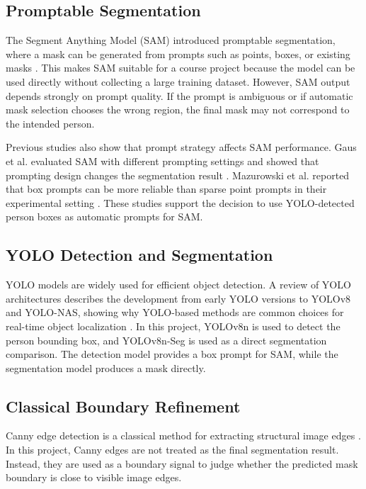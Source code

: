 \documentclass[conference]{IEEEtran}
\begin{document}
\subsection{Promptable Segmentation}
The Segment Anything Model (SAM) introduced promptable segmentation, where a mask can be generated from prompts such as points, boxes, or existing masks \cite{kirillov2023segmentanything}. This makes SAM suitable for a course project because the model can be used directly without collecting a large training dataset. However, SAM output depends strongly on prompt quality. If the prompt is ambiguous or if automatic mask selection chooses the wrong region, the final mask may not correspond to the intended person.

Previous studies also show that prompt strategy affects SAM performance. Gaus et al. evaluated SAM with different prompting settings and showed that prompting design changes the segmentation result \cite{gaus2024variationalprompting}. Mazurowski et al. reported that box prompts can be more reliable than sparse point prompts in their experimental setting \cite{mazurowski2023sammedical}. These studies support the decision to use YOLO-detected person boxes as automatic prompts for SAM.

\subsection{YOLO Detection and Segmentation}
YOLO models are widely used for efficient object detection. A review of YOLO architectures describes the development from early YOLO versions to YOLOv8 and YOLO-NAS, showing why YOLO-based methods are common choices for real-time object localization \cite{terven2023yoloreview}. In this project, YOLOv8n is used to detect the person bounding box, and YOLOv8n-Seg is used as a direct segmentation comparison. The detection model provides a box prompt for SAM, while the segmentation model produces a mask directly.

\subsection{Classical Boundary Refinement}
Canny edge detection is a classical method for extracting structural image edges \cite{canny1986computational}. In this project, Canny edges are not treated as the final segmentation result. Instead, they are used as a boundary signal to judge whether the predicted mask boundary is close to visible image edges.
\end{document}
